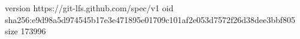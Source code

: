 version https://git-lfs.github.com/spec/v1
oid sha256:e9d98a5d974545b17e3e471895e01709c101af2e053d7572f26d38dee3bbf805
size 173996
